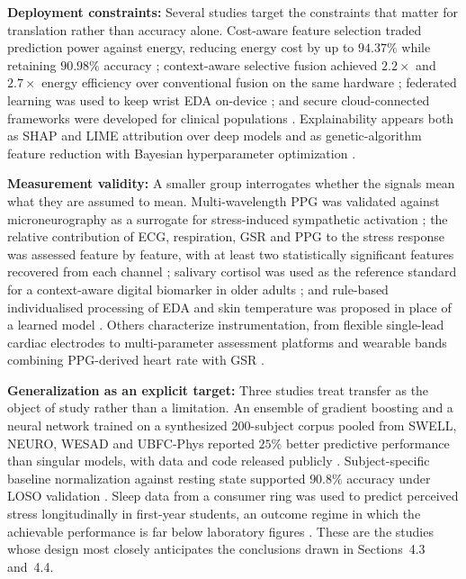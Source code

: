 \documentclass[11pt,a4paper]{article}
\begin{document}
\textbf{Deployment constraints:} Several studies target the constraints that matter for
translation rather than accuracy alone. Cost-aware feature selection traded prediction power
against energy, reducing energy cost by up to $94.37\%$ while retaining $90.98\%$ accuracy
\cite{r54}; context-aware selective fusion achieved $2.2\times$ and $2.7\times$ energy
efficiency over conventional fusion on the same hardware \cite{r58}; federated learning was
used to keep wrist EDA on-device \cite{r72}; and secure cloud-connected frameworks were
developed for clinical populations \cite{r51}. Explainability appears both as SHAP and LIME
attribution over deep models \cite{r22} and as genetic-algorithm feature reduction with
Bayesian hyperparameter optimization \cite{r53}.

\textbf{Measurement validity:} A smaller group interrogates whether the signals mean what they
are assumed to mean. Multi-wavelength PPG was validated against microneurography as a
surrogate for stress-induced sympathetic activation \cite{r86}; the relative contribution of
ECG, respiration, GSR and PPG to the stress response was assessed feature by feature, with at
least two statistically significant features recovered from each channel \cite{r29}; salivary
cortisol was used as the reference standard for a context-aware digital biomarker in older
adults \cite{r73}; and rule-based individualised processing of EDA and skin temperature was
proposed in place of a learned model \cite{r48}. Others characterize instrumentation, from
flexible single-lead cardiac electrodes \cite{r76} to multi-parameter assessment platforms
\cite{r41} and wearable bands combining PPG-derived heart rate with GSR \cite{r24}.

\textbf{Generalization as an explicit target:} Three studies treat transfer as the object of
study rather than a limitation. An ensemble of gradient boosting and a neural network trained
on a synthesized 200-subject corpus pooled from SWELL, NEURO, WESAD and UBFC-Phys reported
$25\%$ better predictive performance than singular models, with data and code released
publicly \cite{r101}. Subject-specific baseline normalization against resting state supported
$90.8\%$ accuracy under LOSO validation \cite{r21}. Sleep data from a consumer ring was used
to predict perceived stress longitudinally in first-year students, an outcome regime in which
the achievable performance is far below laboratory figures \cite{r102}. These are the studies
whose design most closely anticipates the conclusions drawn in Sections~4.3 and~4.4.
\end{document}
